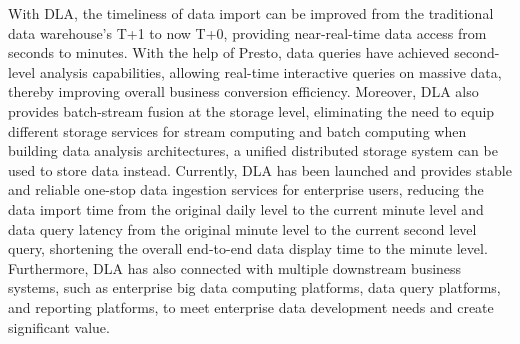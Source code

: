 \begin{abstract*}
With DLA, the timeliness of data import can be improved from the traditional
data warehouse's T+1 to now T+0, providing near-real-time data access from
seconds to minutes. With the help of Presto, data queries have achieved second-level
analysis capabilities, allowing real-time interactive queries on massive data,
thereby improving overall business conversion efficiency. Moreover, DLA also provides
batch-stream fusion at the storage level, eliminating the need to equip different
storage services for stream computing and batch computing when building data analysis
architectures, a unified distributed storage system can be used to store data instead.
Currently, DLA has been launched and provides stable and reliable one-stop data ingestion
services for enterprise users, reducing the data import time from the original daily level
to the current minute level and data query latency from the original minute level to the
current second level query, shortening the overall end-to-end data display time to the
minute level. Furthermore, DLA has also connected with multiple downstream business systems,
such as enterprise big data computing platforms, data query platforms, and reporting platforms,
to meet enterprise data development needs and create significant value.

\end{abstract*}
